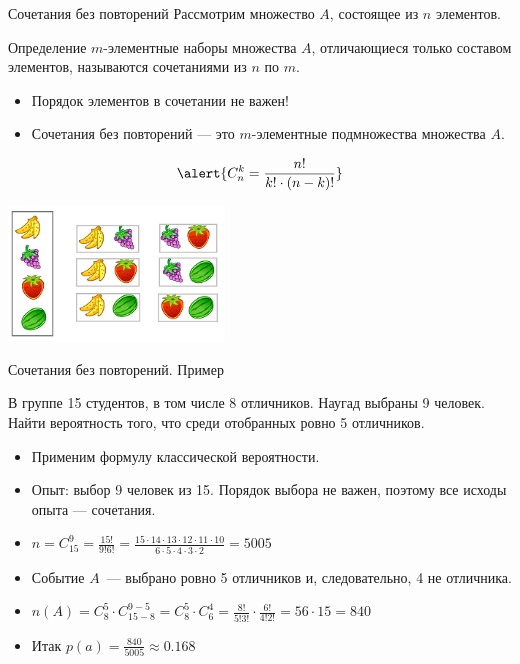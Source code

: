 \documentclass[unicode,11pt,notheorems,xcolor=table]{beamer}
\begin{document}
\begin{frame}{Сочетания без повторений}
    Рассмотрим множество $A$, состоящее из $n$ элементов.
    
    \begin{block}{Определение}
        $m$-элементные наборы множества $A$, отличающиеся только составом элементов, называются \alert{сочетаниями из $n$ по $m$}. 
    \end{block}
    \begin{itemize}
        \item Порядок элементов в сочетании не важен!
        \item Сочетания без повторений --- это $m$-элементные подмножества множества $A$.
    \end{itemize}
    $$
        \alert{C_n^k=\frac{n!}{k!\cdot (n-k)!}}
    $$
    {\centering \includegraphics[width=0.43\textwidth]{combinations.png}\par}

\end{frame}

\begin{frame}{Сочетания без повторений. Пример}
    \begin{exampleblock}{}
        В группе 15 студентов, в том числе 8 отличников. Наугад выбраны 9 человек. Найти вероятность того, что среди отобранных ровно 5 отличников.       
    \end{exampleblock}
    \begin{itemize}
        \item Применим формулу классической вероятности.
        \item Опыт: выбор 9 человек из 15. Порядок выбора не важен, поэтому все исходы опыта --- сочетания.
        \item \alert{$n=C_{15}^9= \frac{15!}{9!6!}=\frac{15\cdot 14\cdot 13\cdot 12\cdot 11\cdot 10}{6\cdot 5 \cdot 4 \cdot 3\cdot 2}=5005$}
        \item Событие $A$~--- выбрано ровно 5 отличников и, следовательно, 4 не отличника. 
        \item \alert{$n(A)= C_{8}^5\cdot C_{15-8}^{9-5}=C_{8}^5\cdot C_{6}^{4}= \frac{8!}{5!3!}\cdot \frac{6!}{4!2!}=56\cdot 15=840$}
        \item Итак \alert{$p(a)=\frac{840}{5005}\approx 0.168$}
    \end{itemize}
\end{frame}
\end{document}
